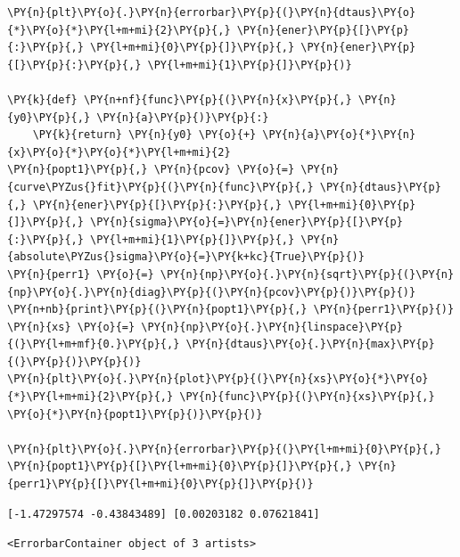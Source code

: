     \begin{tcolorbox}[breakable, size=fbox, boxrule=1pt, pad at break*=1mm,colback=cellbackground, colframe=cellborder]
\begin{Verbatim}[commandchars=\\\{\}]
\PY{n}{plt}\PY{o}{.}\PY{n}{errorbar}\PY{p}{(}\PY{n}{dtaus}\PY{o}{*}\PY{o}{*}\PY{l+m+mi}{2}\PY{p}{,} \PY{n}{ener}\PY{p}{[}\PY{p}{:}\PY{p}{,} \PY{l+m+mi}{0}\PY{p}{]}\PY{p}{,} \PY{n}{ener}\PY{p}{[}\PY{p}{:}\PY{p}{,} \PY{l+m+mi}{1}\PY{p}{]}\PY{p}{)}

\PY{k}{def} \PY{n+nf}{func}\PY{p}{(}\PY{n}{x}\PY{p}{,} \PY{n}{y0}\PY{p}{,} \PY{n}{a}\PY{p}{)}\PY{p}{:}
    \PY{k}{return} \PY{n}{y0} \PY{o}{+} \PY{n}{a}\PY{o}{*}\PY{n}{x}\PY{o}{*}\PY{o}{*}\PY{l+m+mi}{2}
\PY{n}{popt1}\PY{p}{,} \PY{n}{pcov} \PY{o}{=} \PY{n}{curve\PYZus{}fit}\PY{p}{(}\PY{n}{func}\PY{p}{,} \PY{n}{dtaus}\PY{p}{,} \PY{n}{ener}\PY{p}{[}\PY{p}{:}\PY{p}{,} \PY{l+m+mi}{0}\PY{p}{]}\PY{p}{,} \PY{n}{sigma}\PY{o}{=}\PY{n}{ener}\PY{p}{[}\PY{p}{:}\PY{p}{,} \PY{l+m+mi}{1}\PY{p}{]}\PY{p}{,} \PY{n}{absolute\PYZus{}sigma}\PY{o}{=}\PY{k+kc}{True}\PY{p}{)}
\PY{n}{perr1} \PY{o}{=} \PY{n}{np}\PY{o}{.}\PY{n}{sqrt}\PY{p}{(}\PY{n}{np}\PY{o}{.}\PY{n}{diag}\PY{p}{(}\PY{n}{pcov}\PY{p}{)}\PY{p}{)}
\PY{n+nb}{print}\PY{p}{(}\PY{n}{popt1}\PY{p}{,} \PY{n}{perr1}\PY{p}{)}
\PY{n}{xs} \PY{o}{=} \PY{n}{np}\PY{o}{.}\PY{n}{linspace}\PY{p}{(}\PY{l+m+mf}{0.}\PY{p}{,} \PY{n}{dtaus}\PY{o}{.}\PY{n}{max}\PY{p}{(}\PY{p}{)}\PY{p}{)}
\PY{n}{plt}\PY{o}{.}\PY{n}{plot}\PY{p}{(}\PY{n}{xs}\PY{o}{*}\PY{o}{*}\PY{l+m+mi}{2}\PY{p}{,} \PY{n}{func}\PY{p}{(}\PY{n}{xs}\PY{p}{,} \PY{o}{*}\PY{n}{popt1}\PY{p}{)}\PY{p}{)}

\PY{n}{plt}\PY{o}{.}\PY{n}{errorbar}\PY{p}{(}\PY{l+m+mi}{0}\PY{p}{,} \PY{n}{popt1}\PY{p}{[}\PY{l+m+mi}{0}\PY{p}{]}\PY{p}{,} \PY{n}{perr1}\PY{p}{[}\PY{l+m+mi}{0}\PY{p}{]}\PY{p}{)}
\end{Verbatim}
\end{tcolorbox}

    \begin{Verbatim}[commandchars=\\\{\}]
[-1.47297574 -0.43843489] [0.00203182 0.07621841]
    \end{Verbatim}

            \begin{tcolorbox}[breakable, size=fbox, boxrule=.5pt, pad at break*=1mm, opacityfill=0]
\begin{Verbatim}[commandchars=\\\{\}]
<ErrorbarContainer object of 3 artists>
\end{Verbatim}
\end{tcolorbox}
        
